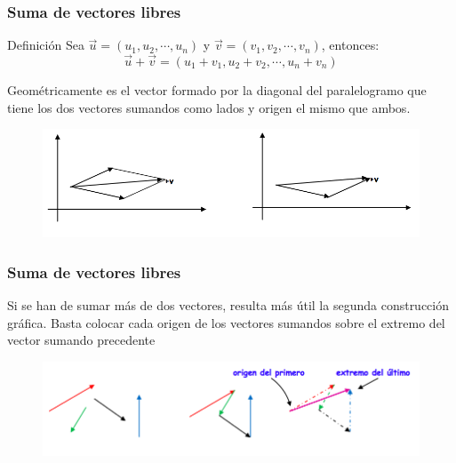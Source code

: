 \documentclass{beamer}
\begin{document}
\begin{frame}
  \frametitle{Suma de vectores libres}
  
  \begin{block}{Definici\'on}
Sea $\vec{u} = (u_1,u_2, \cdots, u_n)$ y $\vec{v} = (v_1,v_2,\cdots,v_n)$, entonces:
\[\vec{u}+\vec{v} = (u_1+v_1, u_2+v_2, \cdots, u_n+v_n)\]
\end{block}
Geom\'etricamente es el vector formado por la diagonal del paralelogramo que tiene los dos vectores sumandos como lados y origen el mismo que ambos.
\begin{figure}[h]
    \label{fig:suma}
\centering
\includegraphics[width = \textwidth]{suma}
\end{figure}
\end{frame}


\begin{frame}
  \frametitle{Suma de vectores libres}
  

Si se han de sumar m\'as de dos vectores, resulta m\'as \'util la segunda construcci\'on gr\'afica. Basta colocar cada origen de los vectores sumandos sobre el extremo del vector sumando precedente
 \begin{figure}[h]
    \label{fig:suma}
\centering
\includegraphics[width = \textwidth]{suma_2}
\end{figure}
\end{frame}
\end{document}
